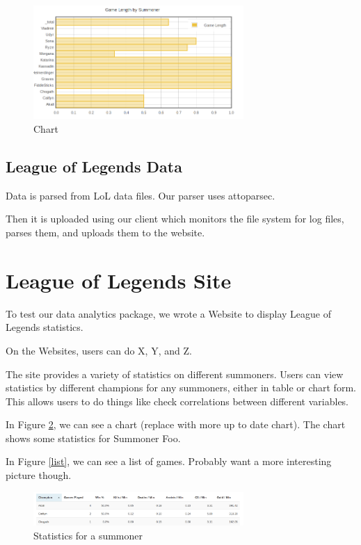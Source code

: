 \documentclass{chi2009}
\begin{document}
\begin{figure}[h]
    \includegraphics[width=80mm]{imgs/chart.png}
    \caption{Chart}
    \label{chart}
\end{figure}

\subsection{League of Legends Data}

Data is parsed from LoL data files. Our parser uses attoparsec.

Then it is uploaded using our client which monitors the file system for log files, parses them, and uploads them to the website. 

\section{League of Legends Site}
\label{site}

To test our data analytics package, we wrote a Website to display League of Legends statistics.

On the Websites, users can do X, Y, and Z. 

The site provides a variety of statistics on different summoners. Users can view statistics by different champions for any summoners, either in table or chart form. This allows users to do things like check correlations between different variables. 

In Figure \ref{chart}, we can see a chart (replace with more up to date chart). The chart shows some statistics for Summoner Foo. 

In Figure \ref{list}, we can see a list of games. Probably want a more interesting picture though.

\begin{figure}[h]
    \includegraphics[width=80mm]{imgs/stats.png}
    \caption{Statistics for a summoner}
    \label{chart}
\end{figure}
\end{document}
